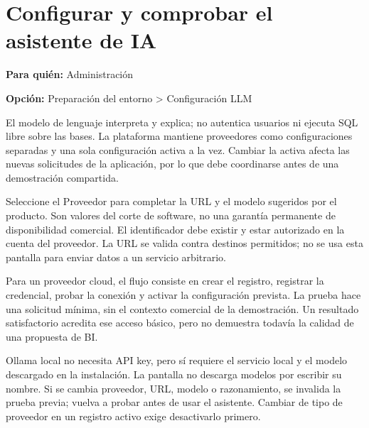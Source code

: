 
\section{Configurar y comprobar el asistente de IA}
\label{unidad:operacion_11}
\textbf{Para quién:} Administración\par
\textbf{Opción:} Preparación del entorno > Configuración LLM\par

El modelo de lenguaje interpreta y explica; no autentica usuarios ni ejecuta SQL libre sobre las bases. La plataforma mantiene proveedores como configuraciones separadas y una sola configuración activa a la vez. Cambiar la activa afecta las nuevas solicitudes de la aplicación, por lo que debe coordinarse antes de una demostración compartida.

Seleccione el Proveedor para completar la URL y el modelo sugeridos por el producto. Son valores del corte de software, no una garantía permanente de disponibilidad comercial. El identificador debe existir y estar autorizado en la cuenta del proveedor. La URL se valida contra destinos permitidos; no se usa esta pantalla para enviar datos a un servicio arbitrario.

Para un proveedor cloud, el flujo consiste en crear el registro, registrar la credencial, probar la conexión y activar la configuración prevista. La prueba hace una solicitud mínima, sin el contexto comercial de la demostración. Un resultado satisfactorio acredita ese acceso básico, pero no demuestra todavía la calidad de una propuesta de BI.

Ollama local no necesita API key, pero sí requiere el servicio local y el modelo descargado en la instalación. La pantalla no descarga modelos por escribir su nombre. Si se cambia proveedor, URL, modelo o razonamiento, se invalida la prueba previa; vuelva a probar antes de usar el asistente. Cambiar de tipo de proveedor en un registro activo exige desactivarlo primero.

